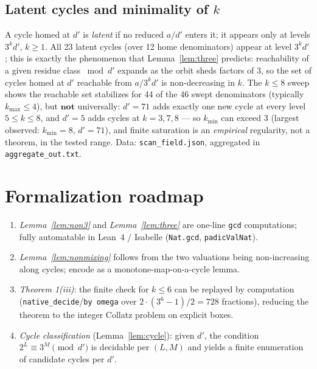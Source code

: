 \documentclass[11pt]{article}
\theoremstyle{remark}
\begin{document}
\subsection{Latent cycles and minimality of \(k\)}\label{sec:latent}
A cycle homed at \(d'\) is \emph{latent} if no reduced \(a/d'\) enters it; it
appears only at levels \(3^{k} d'\), \(k \ge 1\). All 23 latent cycles (over 12
home denominators) appear at level \(3^{k} d'\); this is exactly the phenomenon
that Lemma~\ref{lem:three} predicts: reachability of a given residue class
\(\bmod d'\) expands as the orbit sheds factors of \(3\), so the set of cycles
homed at \(d'\) reachable from \(a/3^{k}d'\) is non-decreasing in \(k\).
The \(k \le 8\) sweep shows the reachable set stabilizes for 44 of the 46 swept
denominators (typically \(k_{\max} \le 4\)), but \(\mathbf{not}\) universally:
\(d' = 71\) adds exactly one new cycle at every level \(5 \le k \le 8\), and
\(d' = 5\) adds cycles at \(k = 3, 7, 8\) — so \(k_{\min}\) can exceed 3 (largest
observed: \(k_{\min} = 8\), \(d' = 71\)), and finite saturation is an
\emph{empirical} regularity, not a theorem, in the tested range.
Data: \texttt{scan\_field.json}, aggregated in \texttt{aggregate\_out.txt}.

\section{Formalization roadmap}
\begin{enumerate}
  \item \emph{Lemma~\ref{lem:non3}} and \emph{Lemma~\ref{lem:three}} are
        one-line \texttt{gcd} computations; fully automatable in Lean~4 /
        Isabelle (\texttt{Nat.gcd}, \texttt{padicValNat}).
  \item \emph{Lemma~\ref{lem:nonmixing}} follows from the two valuations being
        non-increasing along cycles; encode as a monotone-map-on-a-cycle
        lemma.
  \item \emph{Theorem 1(iii)}: the finite check for \(k \le 6\) can be replayed
        by computation (\texttt{native\_decide}/\texttt{by omega} over
        \(2\cdot(3^{6}-1)/2 = 728\) fractions), reducing the theorem to the
        integer Collatz problem on explicit boxes.
  \item \emph{Cycle classification} (Lemma~\ref{lem:cycle}): given \(d'\), the
        condition \(2^{L} \equiv 3^{M} \pmod{d'}\) is decidable per \((L,M)\)
        and yields a finite enumeration of candidate cycles per \(d'\).
\end{enumerate}
\end{document}
